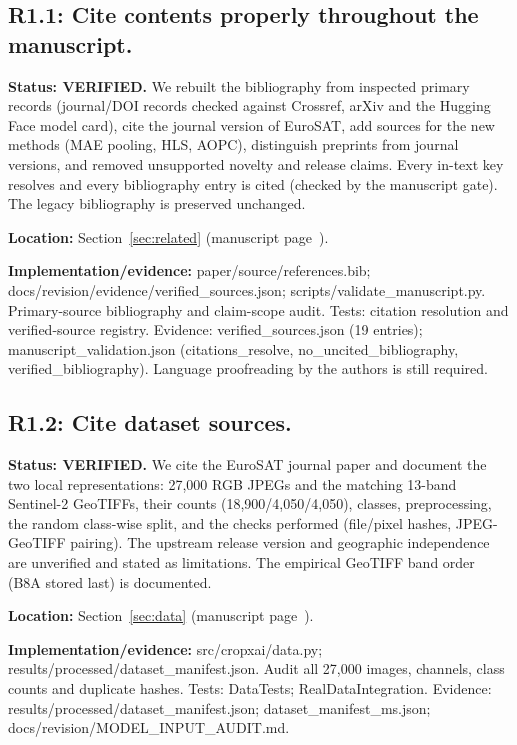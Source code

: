 \documentclass[3p,times,procedia]{elsarticle}
\begin{document}
\subsection*{R1.1: Cite contents properly throughout the manuscript.}

\textbf{Status: VERIFIED.} We rebuilt the bibliography from inspected primary records (journal/DOI records checked against Crossref, arXiv and the Hugging Face model card), cite the journal version of EuroSAT, add sources for the new methods (MAE pooling, HLS, AOPC), distinguish preprints from journal versions, and removed unsupported novelty and release claims. Every in-text key resolves and every bibliography entry is cited (checked by the manuscript gate). The legacy bibliography is preserved unchanged.

\par\textbf{Location:} Section~\ref{sec:related} (manuscript page~\pageref{sec:related}).

\par\textbf{Implementation/evidence:} paper/source/references.bib; docs/revision/evidence/verified\_sources.json; scripts/validate\_manuscript.py. Primary-source bibliography and claim-scope audit. Tests: citation resolution and verified-source registry. Evidence: verified\_sources.json (19 entries); manuscript\_validation.json (citations\_resolve, no\_uncited\_bibliography, verified\_bibliography). Language proofreading by the authors is still required.

\subsection*{R1.2: Cite dataset sources.}

\textbf{Status: VERIFIED.} We cite the EuroSAT journal paper and document the two local representations: 27,000 RGB JPEGs and the matching 13-band Sentinel-2 GeoTIFFs, their counts (18,900/4,050/4,050), classes, preprocessing, the random class-wise split, and the checks performed (file/pixel hashes, JPEG-GeoTIFF pairing). The upstream release version and geographic independence are unverified and stated as limitations. The empirical GeoTIFF band order (B8A stored last) is documented.

\par\textbf{Location:} Section~\ref{sec:data} (manuscript page~\pageref{sec:data}).

\par\textbf{Implementation/evidence:} src/cropxai/data.py; results/processed/dataset\_manifest.json. Audit all 27,000 images, channels, class counts and duplicate hashes. Tests: DataTests; RealDataIntegration. Evidence: results/processed/dataset\_manifest.json; dataset\_manifest\_ms.json; docs/revision/MODEL\_INPUT\_AUDIT.md.
\end{document}
